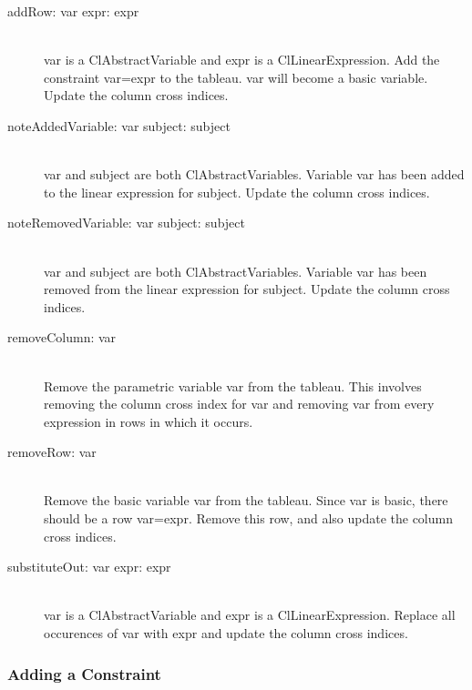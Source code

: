 \documentclass{article}
\begin{document}
\begin{description}

\item[{\sf addRow: var expr: expr}]  \ \\
{\sf var} is a {\sf
ClAbstractVariable} and {\sf expr} is a {\sf ClLinearExpression}.  Add the
constraint {\sf var=expr} to the tableau.  {\sf var} will become a basic
variable.  Update the column cross indices.

\item[{\sf noteAddedVariable: var subject: subject}]  \ \\
{\sf var} and {\sf subject} are both {\sf ClAbstractVariables}.  
Variable {\sf var} has
been added to the linear expression for {\sf subject}.  Update the column
cross indices. 

\item[{\sf noteRemovedVariable: var subject: subject}]  \ \\
{\sf var} and 
{\sf subject} are both {\sf ClAbstractVariables}.  Variable {\sf var} has
been removed from the linear expression for {\sf subject}.  Update the column
cross indices. 

\item[{\sf removeColumn: var}] \ \\
Remove the parametric variable {\sf
var} from the tableau.  This involves removing the column cross index for
{\sf var} and removing {\sf var} from every expression in {\sf rows} in
which it occurs.

\item[{\sf removeRow: var}] \ \\
Remove the basic variable {\sf var} from the
tableau.  Since {\sf var} is basic, there should be a row {\sf var=expr}.
Remove this row, and also update the column cross indices.

\item[{\sf substituteOut: var expr: expr}] \ \\
{\sf var} is a {\sf ClAbstractVariable} and 
{\sf expr} is a {\sf ClLinearExpression}.  Replace
all occurences of {\sf var} with {\sf expr} and update the column cross
indices.

\end{description}

\subsubsection{Adding a Constraint}
\label{cassowary-adding-constraints}
\end{document}
